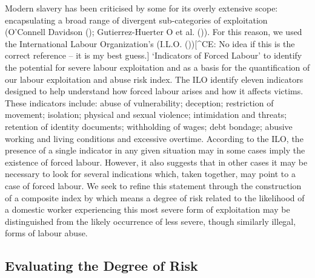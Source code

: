 \documentclass[
  12pt,
]{article}
\theoremstyle{plain}
\theoremstyle{definition}
\begin{document}
Modern slavery has been criticised by some for its overly extensive
scope: encapsulating a broad range of divergent sub-categories of
exploitation (O'Connell Davidson
(); Gutierrez-Huerter
O et al. ()). For
this reason, we used the International Labour Organization's (I.L.O.
()){[}\^{}CE: No idea if this is
the correct reference -- it is my best guess.{]} `Indicators of Forced
Labour' to identify the potential for severe labour exploitation and as
a basis for the quantification of our labour exploitation and abuse risk
index. The ILO identify eleven indicators designed to help understand
how forced labour arises and how it affects victims. These indicators
include: abuse of vulnerability; deception; restriction of movement;
isolation; physical and sexual violence; intimidation and threats;
retention of identity documents; withholding of wages; debt bondage;
abusive working and living conditions and excessive overtime. According
to the ILO, the presence of a single indicator in any given situation
may in some cases imply the existence of forced labour. However, it also
suggests that in other cases it may be necessary to look for several
indications which, taken together, may point to a case of forced labour.
We seek to refine this statement through the construction of a composite
index by which means a degree of risk related to the likelihood of a
domestic worker experiencing this most severe form of exploitation may
be distinguished from the likely occurrence of less severe, though
similarly illegal, forms of labour abuse.

\subsection{Evaluating the Degree of
Risk}\label{evaluating-the-degree-of-risk}
\end{document}
